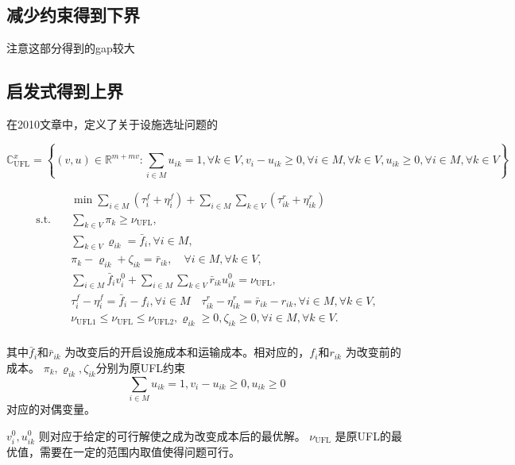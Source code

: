 \documentclass[UTF8]{article}
\begin{document}
\subsection{减少约束得到下界}

注意这部分得到的gap较大

\subsection{启发式得到上界}

在2010文章中，定义了关于设施选址问题的

\[
\mathbb{C}_{\mathrm{UFL}}^{x}=\left\{(v, u) \in \mathbb{R}^{m+m v}: \sum_{i \in M} u_{i k}=1, \forall k \in V, v_{i}-u_{i k} \geq 0, \forall i \in M, \forall k \in V, u_{i k} \geq 0, \forall i \in M, \forall k \in V\right\}
\]


\begin{equation}
\begin{aligned}
&\min \sum_{i \in M} \left(\tau_{i}^{f}+\eta_{i}^{f}\right)+\sum_{i \in M} \sum_{k \in V} \left(\tau_{i k}^r+\eta_{i k}^{r}\right) \\
\text{s.t.} \quad &\sum_{k \in V} \pi_{k} \geq \nu_{\mathrm{UFL}}, \\
&\sum_{k \in V} \varrho_{i k}=\bar{f}_{i}, \forall i \in M, \\
&\pi_{k}-\varrho_{i k}+\zeta_{i k}=\bar{r}_{i k}, \quad \forall i \in M, \forall k \in V, \\
&\sum_{i \in M} \bar{f}_{i} v_{i}^{0}+\sum_{i \in M} \sum_{k \in V} \bar{r}_{i k} u_{i k}^{0}=\nu_{\mathrm{UFL}}, \\
& \tau_{i}^{f}-\eta_{i}^{f}=\bar{f}_{i}-f_{i}, \forall i \in M \quad \tau_{i k}^{r}-\eta_{i k}^{r}=\bar{r}_{i k}-r_{i k}, \forall i \in M, \forall k \in V, \\
&\nu_{\mathrm{UFL} 1} \leq \nu_{\mathrm{UFL}} \leq \nu_{\mathrm{UFL} 2}, \varrho_{i k} \geq 0, \zeta_{i k} \geq 0, \forall i \in M, \forall k \in V. \\
\end{aligned}
\end{equation}

其中$\bar{f}_{i}$和$\bar{r}_{ik}$ 为改变后的开启设施成本和运输成本。相对应的，$f_{i}$和$r_{ik}$ 为改变前的成本。
$\pi_{k},\varrho_{i k},\zeta_{i k}$分别为原UFL约束
\begin{equation*}
\sum_{i \in M} u_{ik} = 1,
v_i - u_{ik} \geq 0,
u_{ik} \geq 0
\end{equation*}
对应的对偶变量。 \par
$v_{i}^{0},u_{i k}^{0}$ 则对应于给定的可行解使之成为改变成本后的最优解。
$\nu_{\mathrm{UFL}}$ 是原UFL的最优值，需要在一定的范围内取值使得问题可行。
\end{document}
